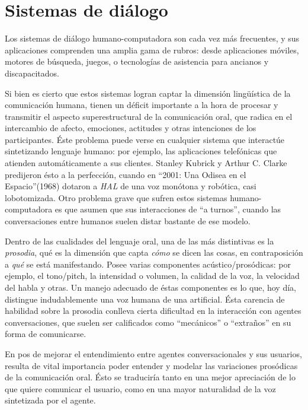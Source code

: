 \section{Sistemas de diálogo}

Los sistemas de diálogo humano-computadora son cada vez más frecuentes, y sus aplicaciones comprenden una amplia gama de rubros: desde aplicaciones móviles, motores de búsqueda, juegos, o tecnologías de asistencia para ancianos y discapacitados.


Si bien es cierto que estos sistemas logran captar la dimensión lingüística de la comunicación humana, tienen un déficit importante a la hora de procesar y transmitir el aspecto superestructural de la comunicación oral, que radica en el intercambio de afecto, emociones, actitudes y otras intenciones de los participantes. Éste problema puede verse en cualquier sistema que interactúe sintetizando lenguaje humano: por ejemplo, las aplicaciones telefónicas que atienden automáticamente a sus clientes. Stanley Kubrick y Arthur C. Clarke predijeron ésto a la perfección, cuando en ``2001: Una Odisea en el Espacio''(1968) dotaron a \emph{HAL} de una voz monótona y robótica, casi lobotomizada. Otro problema grave que sufren estos sistemas humano-computadora es que asumen que sus interacciones de ``a turnos'', cuando las conversaciones entre humanos suelen distar bastante de ese modelo.

Dentro de las cualidades del lenguaje oral, una de las más distintivas es la \emph{prosodia}, qué es la dimensión que capta \emph{cómo} se dicen las cosas, en contraposición a \emph{qué} se está manifestando. Posee varias componentes acústico/prosódicas: por ejemplo, el tono/pitch, la intensidad o volumen, la calidad de la voz, la velocidad del habla y otras. Un manejo adecuado de éstas componentes es lo que, hoy día, distingue indudablemente una voz humana de una artificial. Ésta carencia de habilidad sobre la prosodia conlleva cierta dificultad en la interacción con agentes conversaciones, que suelen ser calificados como ``mecánicos'' o ``extraños'' en su forma de comunicarse.

En pos de mejorar el entendimiento entre agentes conversacionales y sus usuarios, resulta de vital importancia poder entender y modelar las variaciones prosódicas de la comunicación oral. Ésto se traduciría tanto en una mejor apreciación de lo que quiere comunicar el usuario, como en una mayor naturalidad de la voz sintetizada por el agente.

